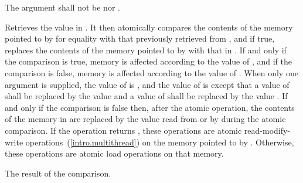 \begin{itemdescr}
\pnum
\requires The  argument shall not be  nor
.

\pnum
\effects Retrieves the value in . It then atomically
compares the contents of the memory pointed to  by 
for equality with that previously retrieved from ,
and if true, replaces the contents of the memory pointed to
 by  with that in .
If and only if the comparison is true, memory is affected according to the
value of , and if the comparison is false, memory is affected according
to the value of . When only one  argument is
supplied, the value of  is , and the value of
 is  except that a value of 
shall be replaced by the value  and a value of
 shall be replaced by the value
.
If and only if the comparison is false then, after the atomic operation,
the contents of the memory in  are replaced by the value
read from  or by  during the atomic comparison.
If the operation returns , these
operations are atomic read-modify-write
operations~(\ref{intro.multithread}) on the memory
pointed to by  .
Otherwise, these operations are atomic load operations on that memory.

\pnum
\returns The result of the comparison.


\end{itemdescr}
